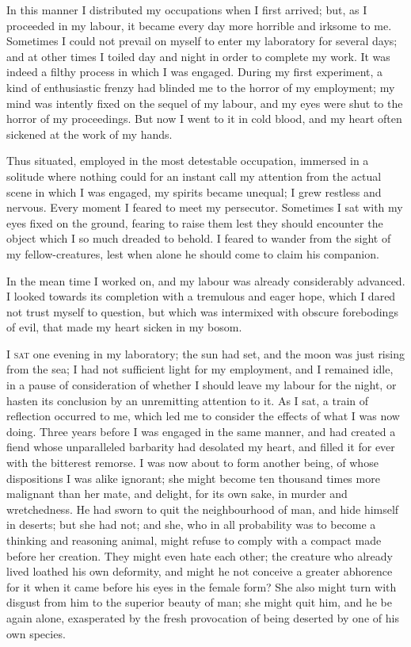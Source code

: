 In this manner I distributed my occupations
when I first arrived; but, as
I proceeded in my labour, it became
every day more horrible and irksome
to me. Sometimes I could not prevail
on myself to enter my laboratory
for several days; and at other times
I toiled day and night in order to complete
my work. It was indeed a filthy
process in which I was engaged. During
my first experiment, a kind of enthusiastic
frenzy had blinded me to the horror
of my employment; my mind was
intently fixed on the sequel of my labour,
and my eyes were shut to the
horror of my proceedings. But now
I went to it in cold blood, and my
heart often sickened at the work of my
hands.

Thus situated, employed in the most
detestable occupation, immersed in a
solitude where nothing could for an instant
call my attention from the actual
scene in which I was engaged, my spirits
became unequal; I grew restless and
nervous. Every moment I feared to
meet my persecutor. Sometimes I sat
with my eyes fixed on the ground,
fearing to raise them lest they should
encounter the object which I so much
dreaded to behold. I feared to wander
from the sight of my fellow-creatures,
lest when alone he should come to
claim his companion.

In the mean time I worked on, and
my labour was already considerably advanced.
I looked towards its completion
with a tremulous and eager
hope, which I dared not trust myself
to question, but which was intermixed
with obscure forebodings of evil, that
made my heart sicken in my bosom.


\textsc{I sat} one evening in my laboratory;
the sun had set, and the moon was just
rising from the sea; I had not sufficient
light for my employment, and I remained
idle, in a pause of consideration of whether
I should leave my labour for the
night, or hasten its conclusion by an
unremitting attention to it. As I sat, a
train of reflection occurred to me,
which led me to consider the effects of
what I was now doing. Three years
before I was engaged in the same manner,
and had created a fiend whose unparalleled
barbarity had desolated my
heart, and filled it for ever with the bitterest
remorse. I was now about to
form another being, of whose dispositions
I was alike ignorant; she might become
ten thousand times more malignant
than her mate, and delight, for its
own sake, in murder and wretchedness.
He had sworn to quit the neighbourhood
of man, and hide himself in deserts; but
she had not; and she, who in all probability
was to become a thinking and
reasoning animal, might refuse to comply
with a compact made before her
creation. They might even hate each
other; the creature who already lived
loathed his own deformity, and might
he not conceive a greater abhorence for
it when it came before his eyes in the
female form? She also might turn with
disgust from him to the superior beauty
of man; she might quit him, and he be
again alone, exasperated by the fresh
provocation of being deserted by one
of his own species.

